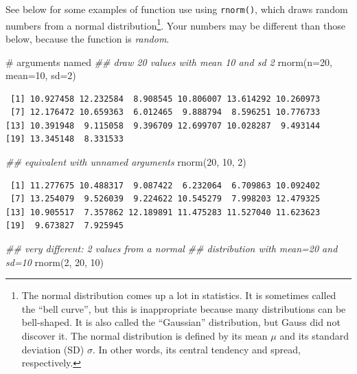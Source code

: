 \documentclass[
  13,
  letterpaper,
]{report}
\newenvironment{Shaded}{\begin{snugshade}}{\end{snugshade}}
\newcommand{\AttributeTok}[1]{\textcolor[rgb]{0.40,0.45,0.13}{#1}}
\newcommand{\CommentTok}[1]{\textcolor[rgb]{0.37,0.37,0.37}{#1}}
\newcommand{\DecValTok}[1]{\textcolor[rgb]{0.68,0.00,0.00}{#1}}
\newcommand{\DocumentationTok}[1]{\textcolor[rgb]{0.37,0.37,0.37}{\textit{#1}}}
\newcommand{\FunctionTok}[1]{\textcolor[rgb]{0.28,0.35,0.67}{#1}}
\newcommand{\NormalTok}[1]{\textcolor[rgb]{0.00,0.23,0.31}{#1}}
\begin{document}
See below for some examples of function use using \texttt{rnorm()},
which draws random numbers from a normal distribution\footnote{The
  normal distribution comes up a lot in statistics. It is sometimes
  called the ``bell curve'', but this is inappropriate because many
  distributions can be bell-shaped. It is also called the ``Gaussian''
  distribution, but Gauss did not discover it. The normal distribution
  is defined by its mean \(\mu\) and its standard deviation (SD)
  \(\sigma\). In other words, its central tendency and spread,
  respectively.}. Your numbers may be different than those below,
because the function is \emph{random}.

\begin{Shaded}
\begin{Highlighting}[]
\CommentTok{\# arguments named}
\DocumentationTok{\#\# draw 20 values with mean 10 and sd 2}
\FunctionTok{rnorm}\NormalTok{(}\AttributeTok{n=}\DecValTok{20}\NormalTok{, }\AttributeTok{mean=}\DecValTok{10}\NormalTok{, }\AttributeTok{sd=}\DecValTok{2}\NormalTok{)}
\end{Highlighting}
\end{Shaded}

\begin{verbatim}
 [1] 10.927458 12.232584  8.908545 10.806007 13.614292 10.260973
 [7] 12.176472 10.659363  6.012465  9.888794  8.596251 10.776733
[13] 10.391948  9.115058  9.396709 12.699707 10.028287  9.493144
[19] 13.345148  8.331533
\end{verbatim}

\begin{Shaded}
\begin{Highlighting}[]
\DocumentationTok{\#\# equivalent with unnamed arguments}
\FunctionTok{rnorm}\NormalTok{(}\DecValTok{20}\NormalTok{, }\DecValTok{10}\NormalTok{, }\DecValTok{2}\NormalTok{)}
\end{Highlighting}
\end{Shaded}

\begin{verbatim}
 [1] 11.277675 10.488317  9.087422  6.232064  6.709863 10.092402
 [7] 13.254079  9.526039  9.224622 10.545279  7.998203 12.479325
[13] 10.905517  7.357862 12.189891 11.475283 11.527040 11.623623
[19]  9.673827  7.925945
\end{verbatim}

\begin{Shaded}
\begin{Highlighting}[]
\DocumentationTok{\#\# very different: 2 values from a normal}
\DocumentationTok{\#\# distribution with mean=20 and sd=10}
\FunctionTok{rnorm}\NormalTok{(}\DecValTok{2}\NormalTok{, }\DecValTok{20}\NormalTok{, }\DecValTok{10}\NormalTok{)}
\end{Highlighting}
\end{Shaded}
\end{document}
